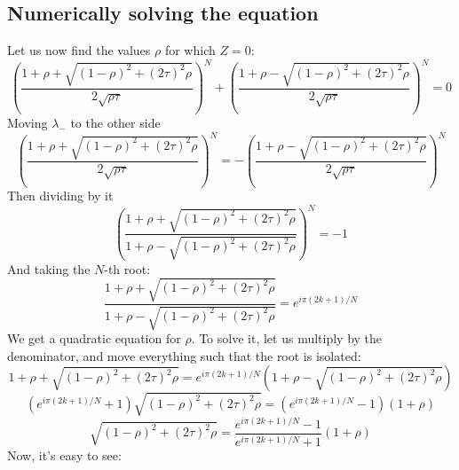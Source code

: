 \documentclass{article}
\begin{document}
\subsection{Numerically solving the equation}
Let us now find the values $\rho$ for which $Z = 0$:
\begin{equation}
    \left(\frac{1 + \rho + \sqrt{\left(1 - \rho\right)^2 + \left(2\tau\right)^2\rho}}{2\sqrt{\rho\tau}}\right)^N + \left(\frac{1 + \rho - \sqrt{\left(1 - \rho\right)^2 + \left(2\tau\right)^2\rho}}{2\sqrt{\rho\tau}}\right)^N = 0
\end{equation}
Moving $\lambda_{-}$ to the other side
\begin{equation}
    \left(\frac{1 + \rho + \sqrt{\left(1 - \rho\right)^2 + \left(2\tau\right)^2\rho}}{2\sqrt{\rho\tau}}\right)^N = - \left(\frac{1 + \rho - \sqrt{\left(1 - \rho\right)^2 + \left(2\tau\right)^2\rho}}{2\sqrt{\rho\tau}}\right)^N
\end{equation}
Then dividing by it
\begin{equation}
    \left(\frac{1 + \rho + \sqrt{\left(1 - \rho\right)^2 + \left(2\tau\right)^2\rho}}{1 + \rho - \sqrt{\left(1 - \rho\right)^2 + \left(2\tau\right)^2\rho}}\right)^N = - 1
\end{equation}
And taking the $N$-th root:
\begin{equation}
    \frac{1 + \rho + \sqrt{\left(1 - \rho\right)^2 + \left(2\tau\right)^2\rho}}{1 + \rho - \sqrt{\left(1 - \rho\right)^2 + \left(2\tau\right)^2\rho}} = e^{i\pi (2k+1)/N}
\end{equation}
We get a quadratic equation for $\rho$. To solve it, let us multiply by the denominator, and move everything such that the root is isolated:
\begin{equation}
    1 + \rho + \sqrt{\left(1 - \rho\right)^2 + \left(2\tau\right)^2\rho} = e^{i\pi (2k+1)/N} \left(
        1 + \rho - \sqrt{\left(1 - \rho\right)^2 + \left(2\tau\right)^2\rho}
    \right)
\end{equation}
\begin{equation}
    \left(
        e^{i\pi (2k+1)/N} + 1\right)\sqrt{\left(1 - \rho\right)^2 + \left(2\tau\right)^2\rho}
     =  \left(e^{i\pi (2k+1)/N} - 1\right)\left(
        1 + \rho
    \right)
\end{equation}
\begin{equation}
    \sqrt{\left(1 - \rho\right)^2 + \left(2\tau\right)^2\rho}
     =  \frac{e^{i\pi (2k+1)/N} - 1}{e^{i\pi (2k+1)/N} + 1}\left(
        1 + \rho
    \right)
\end{equation}
Now, it's easy to see:
\end{document}
